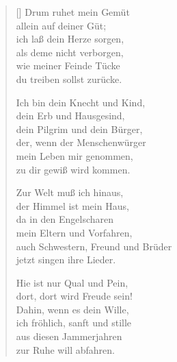 \begin{multicols}{2}
\begin{verse}[\versewidth]
 Drum ruhet mein Gemüt\\
allein auf deiner Güt;\\
ich laß dein Herze sorgen,\\
als deme nicht verborgen,\\
wie meiner Feinde Tücke\\
du treiben sollst zurücke.

 Ich bin dein Knecht und Kind,\\
dein Erb und Hausgesind,\\
dein Pilgrim und dein Bürger,\\
der, wenn der Menschenwürger\\
mein Leben mir genommen,\\
zu dir gewiß wird kommen.

 Zur Welt muß ich hinaus,\\
der Himmel ist mein Haus,\\
da in den Engelscharen\\
mein Eltern und Vorfahren,\\
auch Schwestern, Freund und Brüder\\
jetzt singen ihre Lieder.

 Hie ist nur Qual und Pein,\\
dort, dort wird Freude sein!\\
Dahin, wenn es dein Wille,\\
ich fröhlich, sanft und stille\\
aus diesen Jammerjahren\\
zur Ruhe will abfahren.
   
\end{verse}
\end{multicols}
